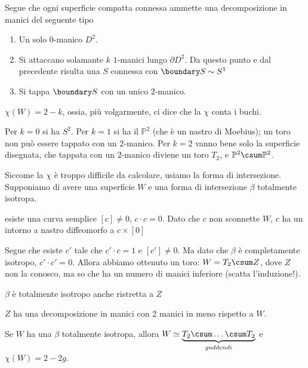 Segue che ogni superficie compatta connessa ammette una decomposizione in manici del seguente tipo
\begin{enumerate}
 \item Un solo $0$-manico $D^2$.
 \item Si attaccano solamante $k$ $1$-manici lungo $\partial D^2$. Da questo punto e dal precedente risulta una $S$ connessa con $\boundary S \sim S^1$
 \item Si tappa $\boundary S$ con un unico $2$-manico.
\end{enumerate}
\begin{oss}
 $\chi(W) = 2-k$, ossia, più volgarmente, ci dice che la $\chi$ conta i buchi.
\end{oss}
\begin{es}
 Per $k=0$ si ha $S^2$. Per $k=1$ si ha il $\mathbb P^2$ (che è un nastro di Moebius); un toro non può essere tappato con un $2$-manico.
 Per $k=2$ vanno bene solo la superficie disegnata, che tappata con un $2$-manico diviene un toro $T_2$, e $\mathbb P^2 \csum \mathbb P ^2$.
\end{es}

Siccome la $\chi$ è troppo difficile da calcolare, usiamo la forma di intersezione. 
Supponiamo di avere una superficie $W$ e una forma di intersezione $\beta$ totalmente isotropa.
\begin{oss}
 esiste una curva semplice $\left [ c\right ]\neq 0$, $c\cdot c = 0$. Dato che $c$ non sconnette $W$, $c$ ha un intorno a nastro diffeomorfo a $c \times \left[ 0 \right ]$
\end{oss}
Segue che esiste $c'$ tale che $c'\cdot c = 1$ e $\left [ c' \right ]\neq 0$. Ma dato che $\beta$ è completamente isotropo, $c' \cdot c'= 0$.
Allora abbiamo ottenuto un toro: $W = T_2\csum Z$, dove $Z$ non la conosco, ma so che ha un numero di manici inferiore (scatta l'induzione!).
\begin{oss}
 $\beta$ è totalmente isotropo anche ristretta a $Z$
\end{oss}
\begin{oss}
 $Z$ ha una decomposizione in manici con 2 manici in meno rispetto a $W$.
\end{oss}
\begin{teo}
 Se $W$ ha una $\beta$ totalmente isotropa, allora $W\simeq \underbrace {T_2\csum \dots \csum T_2}_{g addendi}$ e $\chi (W) = 2 - 2g$.
\end{teo}

